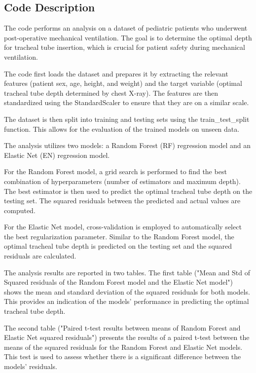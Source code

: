 \documentclass[11pt]{article}
\begin{document}
\subsection{Code Description}

The code performs an analysis on a dataset of pediatric patients who underwent post-operative mechanical ventilation. The goal is to determine the optimal depth for tracheal tube insertion, which is crucial for patient safety during mechanical ventilation.

The code first loads the dataset and prepares it by extracting the relevant features (patient sex, age, height, and weight) and the target variable (optimal tracheal tube depth determined by chest X-ray). The features are then standardized using the StandardScaler to ensure that they are on a similar scale.

The dataset is then split into training and testing sets using the train\_test\_split function. This allows for the evaluation of the trained models on unseen data.

The analysis utilizes two models: a Random Forest (RF) regression model and an Elastic Net (EN) regression model.

For the Random Forest model, a grid search is performed to find the best combination of hyperparameters (number of estimators and maximum depth). The best estimator is then used to predict the optimal tracheal tube depth on the testing set. The squared residuals between the predicted and actual values are computed.

For the Elastic Net model, cross-validation is employed to automatically select the best regularization parameter. Similar to the Random Forest model, the optimal tracheal tube depth is predicted on the testing set and the squared residuals are calculated.

The analysis results are reported in two tables. The first table ("Mean and Std of Squared residuals of the Random Forest model and the Elastic Net model") shows the mean and standard deviation of the squared residuals for both models. This provides an indication of the models' performance in predicting the optimal tracheal tube depth.

The second table ("Paired t-test results between means of Random Forest and Elastic Net squared residuals") presents the results of a paired t-test between the means of the squared residuals for the Random Forest and Elastic Net models. This test is used to assess whether there is a significant difference between the models' residuals.
\end{document}
